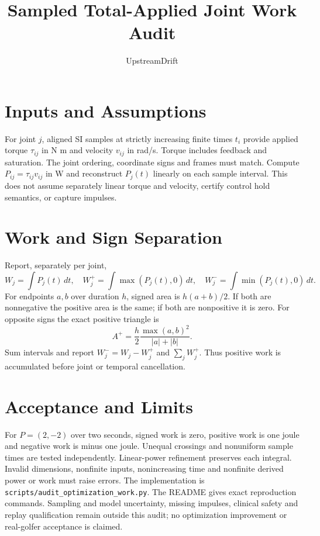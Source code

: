 \documentclass{article}
\title{Sampled Total-Applied Joint Work Audit}
\author{UpstreamDrift}
\begin{document}
\maketitle
\section{Inputs and Assumptions}
For joint $j$, aligned SI samples at strictly increasing finite times $t_i$
provide applied torque $\tau_{ij}$ in N m and velocity $v_{ij}$ in rad/s.
Torque includes feedback and saturation. The joint ordering, coordinate signs
and frames must match. Compute $P_{ij}=\tau_{ij}v_{ij}$ in W and reconstruct
$P_j(t)$ linearly on each sample interval. This does not assume separately
linear torque and velocity, certify control hold semantics, or capture impulses.
\section{Work and Sign Separation}
Report, separately per joint,
\[
 W_j=\int P_j(t)\,dt,\quad
 W_j^+=\int\max(P_j(t),0)\,dt,\quad
 W_j^-=\int\min(P_j(t),0)\,dt.
\]
For endpoints $a,b$ over duration $h$, signed area is $h(a+b)/2$.
If both are nonnegative the positive area is the same; if both are
nonpositive it is zero. For opposite signs the exact positive triangle is
\[
 A^+=\frac{h}{2}\frac{\max(a,b)^2}{|a|+|b|}.
\]
Sum intervals and report $W_j^-=W_j-W_j^+$ and $\sum_j W_j^+$.
Thus positive work is accumulated before joint or temporal cancellation.
\section{Acceptance and Limits}
For $P=(2,-2)$ over two seconds, signed work is zero, positive work is
one joule and negative work is minus one joule. Unequal crossings and
nonuniform sample times are tested independently. Linear-power refinement
preserves each integral. Invalid dimensions, nonfinite inputs, nonincreasing
time and nonfinite derived power or work must raise errors.
The implementation is \texttt{scripts/audit\_optimization\_work.py}.
The README gives exact reproduction commands. Sampling and model uncertainty,
missing impulses, clinical safety and replay qualification remain outside this
audit; no optimization improvement or real-golfer acceptance is claimed.
\end{document}
